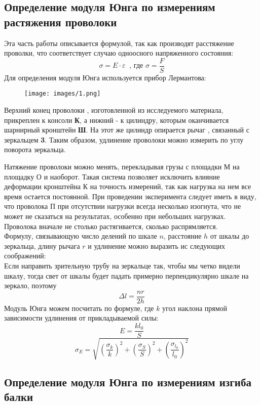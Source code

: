 \documentclass[a4paper,12pt]{article} %
\begin{document}
\subsection{Определение модуля Юнга по измерениям растяжения проволоки}

Эта часть работы описывается формулой, так как производят расстяжение проволки, что соответствует случаю одноосного напряженного состояния:
\[
    \sigma = E \cdot \varepsilon~\text{ , где } \sigma = \frac{F}{S}
\]
Для определения модуля Юнга используется прибор Лермантова:

\begin{figure}[H]
    \centering
    \texttt{[image: images/1.png]}
\end{figure}

Верхний конец проволоки , изготовленной из исследуемого материала, прикреплен к консоли \textbf{К}, а нижний - к цилиндру, которым оканчивается шарнирный кронштейн \textbf{Ш}. На этот же цилиндр опирается рычаг , связанный с зеркальцем \textbf{3}. Таким образом, удлинение проволоки можно измерить по углу поворота зеркальца.

Натяжение проволоки можно менять, перекладывая грузы с площадки М на площадку О и наоборот. Такая система позволяет исключить влияние деформации кронштейна К на точность измерений, так как нагрузка на нем все время остается постоянной.
При проведении эксперимента следует иметь в виду, что проволока П при отсутствии нагрузки всегда несколько изогнута, что не может не сказаться на результатах, особенно при небольших нагрузках. Проволока вначале не столько растягивается, сколько распрямляется.\\
Формулу, связывающую число делений по шкале $n$, расстояние $h$ от шкалы до зеркальца, длину рычага $r$ и удлинение можно выразить ис следующих соображений:\\
Если направить зрительную трубу на зеркальце так, чтобы мы четко видели шкалу, тогда свет от шкалы будет падать примерно перпендикулярно шкале на зеркало, поэтому
\[
    \Delta l =\dfrac{nr}{2h}
\]
Модуль Юнга можем посчитать по формуле, где $k$ угол наклона прямой зависимости удлинения от прикладываемой силы:
\[
    E = \frac{kl_0}{S}
\]
\begin{equation}
    \sigma_E = \sqrt{\left( \dfrac{\sigma_{k}}{k} \right)^2 + \left( \dfrac{\sigma_{S}}{S} \right)^2 + \left( \dfrac{\sigma_{l_0}}{l_0} \right)^2 }
\end{equation}

\subsection{Определение модуля Юнга по измерениям изгиба балки}
\end{document}
